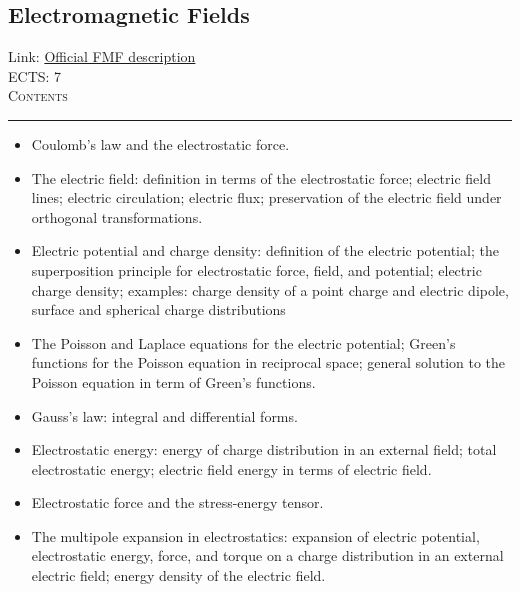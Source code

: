 \documentclass[11pt, a4paper]{article}
\newenvironment{course}[3]{
\subsection{#1}%
Link: \href{#2}{Official FMF description}\\%
ECTS: #3%
\vspace{1ex}
\\
{\large \textsc{Contents}}\\[-0.9ex]%
\rule{\textwidth}{0.5pt}
\vspace{-3ex}
}
{}
\newenvironment{chapter}[1]{
\begin{tcolorbox}[title=#1, breakable]
}
{\end{tcolorbox}}
\begin{document}
\begin{course}{Electromagnetic Fields}{https://www.fmf.uni-lj.si/en/study-physics/programmes/1fiz/2020/7000777/courses/1133/}{7}
    \label{electromagnetic_fields}

    \begin{chapter}{Electrostatics}
        \begin{itemize}
            
            \item Coulomb's law and the electrostatic force.

            \item The electric field: definition in terms of the electrostatic force; electric field lines; electric circulation; electric flux; preservation of the electric field under orthogonal transformations.

            \item Electric potential and charge density: definition of the electric potential; the superposition principle for electrostatic force, field, and potential; electric charge density; examples: charge density of a point charge and electric dipole, surface and spherical charge distributions 

            \item The Poisson and Laplace equations for the electric potential; Green's functions for the Poisson equation in reciprocal space; general solution to the Poisson equation in term of Green's functions.

            \item Gauss's law: integral and differential forms.

            \item Electrostatic energy: energy of charge distribution in an external field; total electrostatic energy; electric field energy in terms of electric field.

            \item Electrostatic force and the stress-energy tensor.

            \item The multipole expansion in electrostatics: expansion of electric potential, electrostatic energy, force, and torque on a charge distribution in an external electric field; energy density of the electric field.

        \end{itemize}
    \end{chapter}

    \begin{chapter}{Magnetostatics}


\end{chapter}
\end{course}
\end{document}
